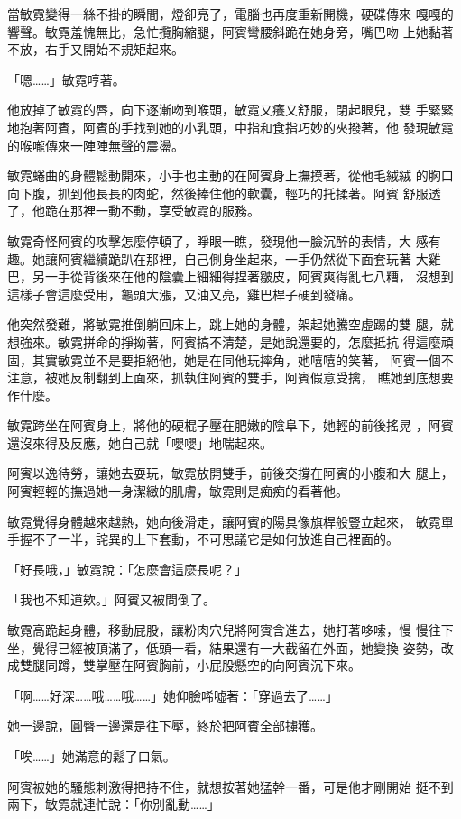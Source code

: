 當敏霓變得一絲不掛的瞬間，燈卻亮了，電腦也再度重新開機，硬碟傳來
嘎嘎的響聲。敏霓羞愧無比，急忙攬胸縮腿，阿賓彎腰斜跪在她身旁，嘴巴吻
上她黏著不放，右手又開始不規矩起來。

「嗯……」敏霓哼著。

他放掉了敏霓的唇，向下逐漸吻到喉頭，敏霓又癢又舒服，閉起眼兒，雙
手緊緊地抱著阿賓，阿賓的手找到她的小乳頭，中指和食指巧妙的夾撥著，他
發現敏霓的喉嚨傳來一陣陣無聲的震盪。

敏霓蜷曲的身體鬆動開來，小手也主動的在阿賓身上撫摸著，從他毛絨絨
的胸口向下腹，抓到他長長的肉蛇，然後捧住他的軟囊，輕巧的托揉著。阿賓
舒服透了，他跪在那裡一動不動，享受敏霓的服務。

敏霓奇怪阿賓的攻擊怎麼停頓了，睜眼一瞧，發現他一臉沉醉的表情，大
感有趣。她讓阿賓繼續跪趴在那裡，自己側身坐起來，一手仍然從下面套玩著
大雞巴，另一手從背後來在他的陰囊上細細得捏著皺皮，阿賓爽得亂七八糟，
沒想到這樣子會這麼受用，龜頭大漲，又油又亮，雞巴桿子硬到發痛。

他突然發難，將敏霓推倒躺回床上，跳上她的身體，架起她騰空虛踢的雙
腿，就想強來。敏霓拼命的掙拗著，阿賓搞不清楚，是她說還要的，怎麼抵抗
得這麼頑固，其實敏霓並不是要拒絕他，她是在同他玩摔角，她嘻嘻的笑著，
阿賓一個不注意，被她反制翻到上面來，抓執住阿賓的雙手，阿賓假意受擒，
瞧她到底想要作什麼。

敏霓跨坐在阿賓身上，將他的硬棍子壓在肥嫩的陰阜下，她輕的前後搖晃
，阿賓還沒來得及反應，她自己就「嚶嚶」地喘起來。

阿賓以逸待勞，讓她去耍玩，敏霓放開雙手，前後交撐在阿賓的小腹和大
腿上，阿賓輕輕的撫過她一身潔緻的肌膚，敏霓則是痴痴的看著他。

敏霓覺得身體越來越熱，她向後滑走，讓阿賓的陽具像旗桿般豎立起來，
敏霓單手握不了一半，詫異的上下套動，不可思議它是如何放進自己裡面的。

「好長哦，」敏霓說：「怎麼會這麼長呢？」

「我也不知道欸。」阿賓又被問倒了。

敏霓高跪起身體，移動屁股，讓粉肉穴兒將阿賓含進去，她打著哆嗦，慢
慢往下坐，覺得已經被頂滿了，低頭一看，結果還有一大截留在外面，她變換
姿勢，改成雙腿同蹲，雙掌壓在阿賓胸前，小屁股懸空的向阿賓沉下來。

「啊……好深……哦……哦……」她仰臉唏噓著：「穿過去了……」

她一邊說，圓臀一邊還是往下壓，終於把阿賓全部擄獲。

「唉……」她滿意的鬆了口氣。

阿賓被她的騷態刺激得把持不住，就想按著她猛幹一番，可是他才剛開始
挺不到兩下，敏霓就連忙說：「你別亂動……」

